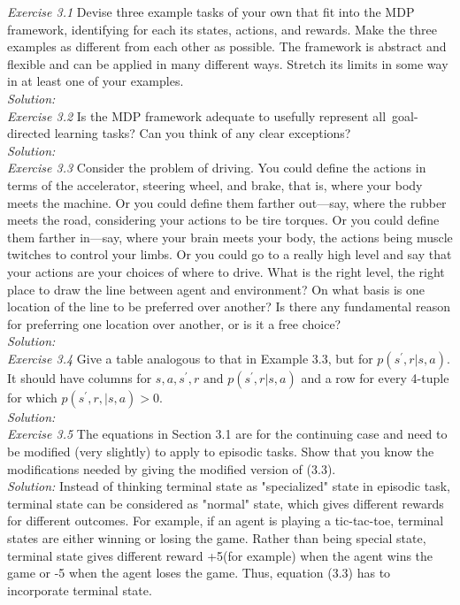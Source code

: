 \documentclass{article}
\begin{document}
\noindent \textit{Exercise 3.1} Devise three example tasks of your own that fit into the MDP framework, identifying for each its states, actions, and rewards. Make the three examples as different from each other as possible. The framework is abstract and flexible and can be applied in many different ways. Stretch its limits in some way in at least one of your examples. \\
\textit{Solution:} \\

\noindent \textit{Exercise 3.2} Is the MDP framework adequate to usefully represent all\ goal-directed learning tasks? Can you think of any clear exceptions? \\
\textit{Solution:} \\

\noindent \textit{Exercise 3.3} Consider the problem of driving. You could define the actions in terms of the accelerator, steering wheel, and brake, that is, where your body meets the machine. Or you could define them farther out—say, where the rubber meets the road, considering your actions to be tire torques. Or you could define them farther in—say, where your brain meets your body, the actions being muscle twitches to control your limbs. Or you could go to a really high level and say that your actions are your choices of where to drive. What is the right level, the right place to draw the line between agent and environment? On what basis is one location of the line to be preferred over another? Is there any fundamental reason for preferring one location over another, or is it a free choice? \\
\textit{Solution:} \\

\noindent \textit{Exercise 3.4} Give a table analogous to that in Example 3.3, but for $p(s^{\prime}, r|s, a)$. It should have columns for $s, a, s^{\prime}, r \text{ and } p(s^{\prime}, r|s,a)$ and a row for every 4-tuple for which $p(s^{\prime}, r,|s,a) > 0$. \\
\textit{Solution:} \\

\noindent \textit{Exercise 3.5} The equations in Section 3.1 are for the continuing case and need to be modified (very slightly) to apply to episodic tasks. Show that you know the modifications needed by giving the modified version of (3.3). \\
\textit{Solution:} Instead of thinking terminal state as "specialized" state in episodic task, terminal state can be considered as "normal" state, which gives different rewards for different outcomes. For example, if an agent is playing a tic-tac-toe, terminal states are either winning or losing the game. Rather than being special state, terminal state gives different reward +5(for example) when the agent wins the game or -5 when the agent loses the game. Thus, equation (3.3) has to incorporate terminal state.
\end{document}
